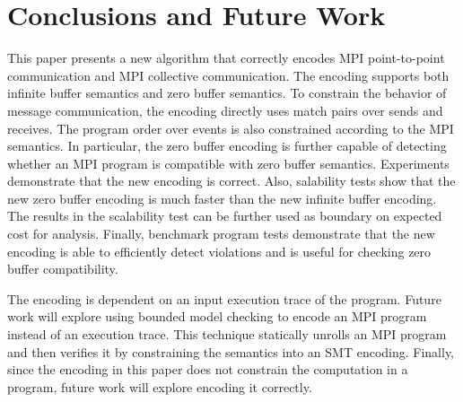 \section{Conclusions and Future Work}
This paper presents a new algorithm that correctly encodes MPI point-to-point communication and MPI collective communication. The encoding supports both infinite buffer semantics and zero buffer semantics. To constrain the behavior of message communication, the encoding directly uses match pairs over sends and receives. The program order over events is also constrained according to the MPI semantics. In particular, the zero buffer encoding is further capable of detecting whether an MPI program is compatible with zero buffer semantics. Experiments demonstrate that the new encoding is correct. Also, salability tests show that the new zero buffer encoding is much faster than the new infinite buffer encoding. The results in the scalability test can be further used as boundary on expected cost for analysis. Finally, benchmark program tests demonstrate that the new encoding is able to efficiently detect violations and is useful for checking zero buffer compatibility. 

The encoding is dependent on an input execution trace of the program. Future work will explore using bounded model checking to encode an MPI program instead of an execution trace. This technique statically unrolls an MPI program and then verifies it by constraining the semantics into an SMT encoding. Finally, since the encoding in this paper does not constrain the computation in a program, future work will explore encoding it correctly. 